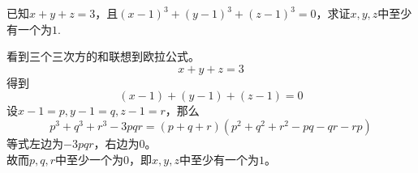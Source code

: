 \documentclass[windows,csize4,answers]{BHCexam}
\begin{document}
\begin{groups}
\begin{questions}[]
\begin{solution}{0.5cm}
        \end{solution}
        \vspace{3.5cm}

        \question[5]  已知$x+y+z=3$，且$(x-1)^3+(y-1)^3+(z-1)^3=0$，求证$x,y,z$中至少有一个为$1$.
        \begin{solution}{0.5cm}
            \methodonly 看到三个三次方的和联想到欧拉公式。
            \begin{equation}
                x+y+z=3
            \end{equation}
            得到
            \begin{equation}
                (x-1)+(y-1)+(z-1)=0
            \end{equation}
            设$x-1=p,y-1=q,z-1=r$，那么
            \begin{equation}
                \label{eq:6_1}
                p^3+q^3+r^3-3pqr=(p+q+r)(p^2+q^2+r^2-pq-qr-rp)
            \end{equation}
            等式左边为$-3pqr$，右边为$0$。 \\ 
            故而$p,q,r$中至少一个为$0$，即$x,y,z$中至少有一个为$1$。

        \end{solution}
        \vspace{3.5cm}


\end{questions}
\end{groups}
\end{document}
